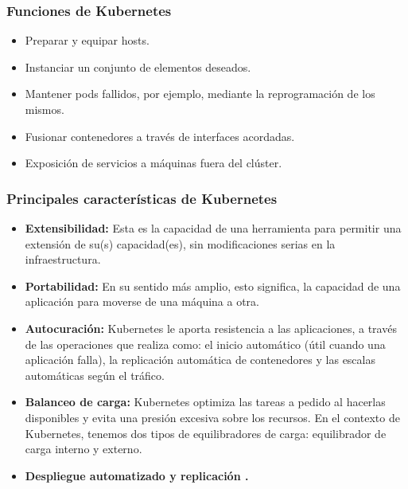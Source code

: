 \subsubsection{Funciones de Kubernetes}
\begin{itemize}
    \item Preparar y equipar hosts.
    \item Instanciar un conjunto de elementos deseados.
    \item Mantener pods fallidos, por ejemplo, mediante la reprogramación de los mismos.
    \item Fusionar contenedores a través de interfaces acordadas.
    \item Exposición de servicios a máquinas fuera del clúster.
\end{itemize}
\subsubsection{Principales características de Kubernetes}
\begin{itemize}
    \item \textbf{Extensibilidad:} Esta es la capacidad de una herramienta para permitir una extensión de su(s) capacidad(es), sin modificaciones serias en la infraestructura.
    \item \textbf{Portabilidad:} En su sentido más amplio, esto significa, la capacidad de una aplicación para moverse de una máquina a otra.
    \item \textbf{Autocuración:} Kubernetes le  aporta resistencia a las aplicaciones, a través de las operaciones que realiza como: el inicio automático (útil cuando una aplicación falla), la replicación automática de contenedores y las escalas automáticas según el tráfico.
    \item \textbf{Balanceo de carga:} Kubernetes optimiza las tareas a pedido al hacerlas disponibles y evita una presión excesiva sobre los recursos. En el contexto de Kubernetes, tenemos dos tipos de equilibradores de carga: equilibrador de carga interno y externo.
    \item \textbf{Despliegue automatizado y replicación \cite{BOOK02}.}
\end{itemize}

